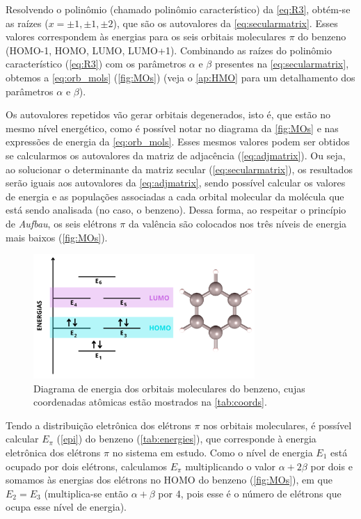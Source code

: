 Resolvendo o polinômio (chamado polinômio característico) da \autoref{eq:R3}, obtém-se as raízes ($x = \pm 1, \pm 1, \pm 2$), que são os autovalores da \autoref{eq:secularmatrix}. Esses valores correspondem às energias para os seis orbitais moleculares $\pi$ do benzeno (\gls{HOMO}-1, \gls{HOMO}, \gls{LUMO}, \gls{LUMO}+1). Combinando as raízes do polinômio característico (\autoref{eq:R3}) com os parâmetros $\alpha$ e $\beta$ presentes na \autoref{eq:secularmatrix}, obtemos a \autoref{eq:orb_mols} (\autoref{fig:MOs}) (veja o \autoref{ap:HMO} para um detalhamento dos parâmetros $\alpha$ e $\beta$).

Os autovalores repetidos vão gerar orbitais degenerados, isto é, que estão no mesmo nível energético, como é possível notar no diagrama da \autoref{fig:MOs} e nas expressões de energia da \autoref{eq:orb_mols}. Esses mesmos valores podem ser obtidos se calcularmos os autovalores da matriz de adjacência (\autoref{eq:adjmatrix}). Ou seja, ao solucionar o determinante da matriz secular (\autoref{eq:secularmatrix}), os resultados serão iguais aos autovalores da \autoref{eq:adjmatrix}, sendo possível calcular os valores de energia e as populações associadas a cada orbital molecular da molécula que está sendo analisada (no caso, o benzeno). Dessa forma, ao respeitar o princípio de \textit{Aufbau}, os seis elétrons $\pi$ da valência são colocados nos três níveis de energia mais baixos (\autoref{fig:MOs}).

\begin{figure}[htb]
\caption{\label{fig:MOs} Diagrama de energia dos orbitais moleculares do benzeno, cujas coordenadas atômicas estão mostrados na \autoref{tab:coords}.}
	\begin{center}
		\includegraphics[width=0.75\textwidth]{images/MOs.png}
	\end{center}
\end{figure}

Tendo a distribuição eletrônica dos elétrons $\pi$ nos orbitais moleculares, é possível calcular $E_\pi$ (\autoref{epi}) do benzeno (\autoref{tab:energies}), que corresponde à energia eletrônica dos elétrons $\pi$ no sistema em estudo. Como o nível de energia $E_1$ está ocupado por dois elétrons, calculamos $E_\pi$ multiplicando o valor $\alpha + 2 \beta$ por dois e somamos às energias dos elétrons no \gls{HOMO} do benzeno (\autoref{fig:MOs}), em que $E_2 = E_3$ (multiplica-se então $\alpha + \beta$ por 4, pois esse é o número de elétrons que ocupa esse nível de energia).


